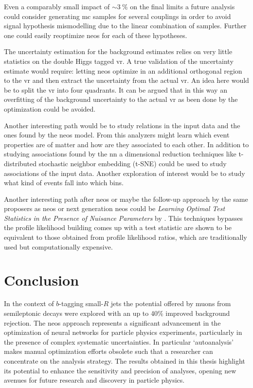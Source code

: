 Even a comparably small impact of $\sim\qty[]{3}{\percent}$ on the final limits a future analysis could consider generating \ac{mc} samples for several \ktwov couplings in order to avoid signal hypothesis mismodelling due to the linear combination of samples. Further one could easily reoptimize neos for each of these hypotheses.

The uncertainty estimation for the background estimates relies on very little statistics on the double Higgs tagged \ac{vr}. A true validation of the uncertainty estimate would require: letting \ac{neos} optimize in an additional orthogonal region to the \ac{vr} and then extract the uncertainty from the actual \ac{vr}. An idea here would be to split the \ac{vr} into four quadrants. It can be argued that in this way an overfitting of the background uncertainty to the actual \ac{vr} as been done by the optimization could be avoided. 

Another interesting path would be to study relations in the input data and the ones found by the \ac{neos} model. From this analyzers might learn which event properties are of matter and how are they associated to each other. In addition to studying associations found by the \ac{nn} a dimensional reduction techniques like t-distributed stochastic neighbor embedding (t-SNE) could be used to study associations of the input data. Another exploration of interest would be to study what kind of events fall into which bins.

Another interesting path after \ac{neos} or maybe the follow-up approach by the same proposers as \ac{neos} or next generation \ac{neos} could be \textit{Learning Optimal Test Statistics in the Presence of Nuisance Parameters} by \citet{heinrich2022learningoptimalteststatistics}. This techniques bypasses the profile likelihood building comes up with a test statistic are shown to be equivalent to those obtained from profile likelihood ratios, which are traditionally used but computationally expensive.








\section{Conclusion}
In the context of $b$-tagging small-$R$ jets the potential offered by muons from semileptonic decays were explored with an up to 40\% improved background rejection. The \ac{neos} approach represents a significant advancement in the optimization of neural networks for particle physics experiments, particularly in the presence of complex systematic uncertainties. In particular `autoanalysis' makes manual optimization efforts obsolete such that a researcher can concentrate on the analysis strategy. The results obtained in this thesis highlight its potential to enhance the sensitivity and precision of analyses, opening new avenues for future research and discovery in particle physics.






